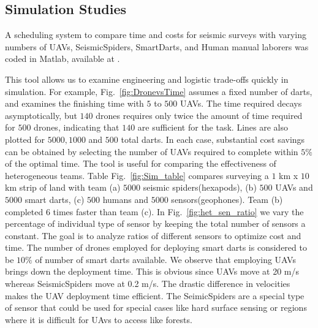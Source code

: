 \subsection{Simulation Studies}

A scheduling system to compare  time and costs for seismic surveys with varying numbers of UAVs, SeismicSpiders, SmartDarts, and Human manual laborers was coded in  {\sc Matlab}, available at \cite{Srikanth2016seismicScheduler}.

This tool allows us to examine engineering and logistic trade-offs quickly in simulation.  For example, Fig.~\ref{fig:DronevsTime} assumes a fixed number of darts, and examines the finishing time with $5$ to $500$ UAVs.  The time required decays asymptotically, but $140$ drones requires only twice the amount of time required for $500$ drones, indicating that $140$ are sufficient for the task. Lines are also plotted for $5000, 1000$ and $500$ total darts.  In each case, substantial cost savings can be obtained by selecting the number of UAVs required to complete within $5\%$ of the optimal time.
The tool is useful for comparing the effectiveness of heterogeneous teams.  Table Fig.~\ref{fig:Sim_table} compares surveying a $1$ km x $10$ km strip of land with team (a) $5000$ seismic spiders(hexapods), (b) $500$ UAVs and $5000$ smart darts, (c) $500$ humans and $5000$ sensors(geophones).  Team (b) completed $6$ times faster than team (c).
In Fig.~\ref{fig:het_sen_ratio} we vary the percentage of individual type of sensor by keeping the total number of sensors a constant. The goal is to analyze ratios of different sensors to optimize cost and time. The number of drones employed for deploying smart darts is considered to be $10\%$ of number of smart darts available. We observe that employing UAVs brings down the deployment time. This is obvious since UAVs move at 20 m/s whereas SeismicSpiders move at 0.2 m/s. The drastic difference in velocities makes the UAV deployment time efficient. The SeimicSpiders are a special type of sensor that could be used for special cases like hard surface sensing or regions where it is difficult for UAvs to access like forests.


